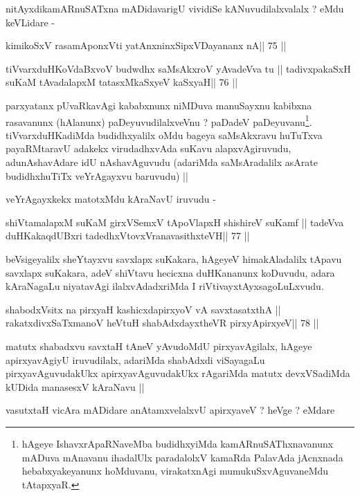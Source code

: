 \begin{artha}
nitAyxdikamARnuSATxna mADidavarigU vividiSe kANuvudilalxvalalx ? eMdu
keVLidare -
\end{artha}

\begin{shl}
kimikoSxV rasamAponxVti yatAnxninxSipxVDayananx nA\hfill || 75 ||
\end{shl}

\begin{shl}
tiVvarxduHKoVdaBxvoV budwdhx saMsAkxroV yAvadeVva tu ||
tadivxpakaSxH suKaM tAvadalapxM tatasxMkaSxyeV kaSxyaH\hfill || 76 ||
\end{shl}

\begin{artha}
parxyatanx pUvaRkavAgi kababxnunx niMDuva manuSayxnu kabibxna
rasavanunx (hAlanunx) paDeyuvudilalxveVnu ? paDadeV
paDeyuvanu\footnote[1]{hAgeye IshavxrApaRNaveMba budidhxyiMda
  kamARnuSAThxnavanunx mADuva mAnavanu ihadalUlx paradalolxV kamaRda
  PalavAda jAcnxnada hebabxyakeyanunx hoMduvanu, virakatxnAgi
  mumukuSxvAguvaneMdu tAtapxyaR.}. tiVvarxduHKadiMda budidhxyalilx
oMdu bageya saMsAkxravu huTuTxva payaRMtaravU adakekx virudadhxvAda
suKavu alapxvAgiruvudu, adunAshavAdare idU nAshavAguvudu (adariMda
saMsAradalilx asArate budidhxhuTiTx veYrAgayxvu baruvudu) ||

veYrAgayxkekx matotxMdu kAraNavU iruvudu -
\end{artha}

\begin{shl}
shiVtamalapxM suKaM girxVSemxV tApoV\s lapxH shishireV suKamf ||
tadeVva duHKakaqdUBxri tadedhxVtovxVranavasithxteVH\hfill || 77 ||
\end{shl}

\begin{artha}
  beVsigeyalilx sheYtayxvu savxlapx suKakara, hAgeyeV himakAladalilx
  tApavu savxlapx suKakara, adeV shiVtavu hecicxna duHKananunx
  koDuvudu, adara kAraNagaLu niyatavAgi ilalxvAdadxriMda I
  riVtivayxtAyxsagoLuLxvudu.
\end{artha}

\begin{shl}
shabodxV\s sitx na pirxyaH kashicxdapirxyoV vA savxtasatxthA ||
rakatxdivxSaTxmanoV heVtuH shabAdxdayxtheVR pirxyApirxyeV\hfill || 78 ||
\end{shl}

\begin{artha}
matutx shabadxvu savxtaH tAneV yAvudoMdU pirxyavAgilalx, hAgeye
apirxyavAgiyU iruvudilalx, adariMda shabAdxdi viSayagaLu
pirxyavAguvudakUkx apirxyavAguvudakUkx rAgariMda matutx devxVSadiMda
kUDida manasesxV kAraNavu ||

vasutxtaH vicAra mADidare anAtamxvelalxvU apirxyaveV ? heVge ? eMdare
\end{artha}

